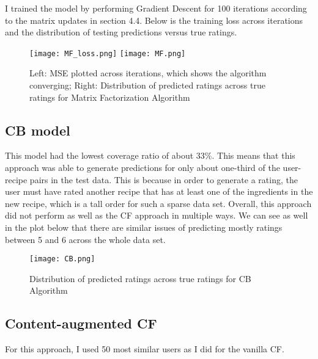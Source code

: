 \documentclass{article}
\begin{document}
I trained the model by performing Gradient Descent for 100 iterations according to the matrix updates in section 4.4. Below is the training loss across iterations and the distribution of testing predictions versus true ratings. 

\begin{figure}[H]
    \centering
    \texttt{[image: MF\_loss.png]}
    \texttt{[image: MF.png]}
    \caption{Left: MSE plotted across iterations, which shows the algorithm converging; Right: Distribution of predicted ratings across true ratings for Matrix Factorization Algorithm}
    \label{fig:CF}
\end{figure}

\subsection{CB model}

This model had the lowest coverage ratio of about 33\%. This means that this approach was able to generate predictions for only about one-third of the user-recipe pairs in the test data. This is because in order to generate a rating, the user must have rated another recipe that has at least one of the ingredients in the new recipe, which is a tall order for such a sparse data set. Overall, this approach did not perform as well as the CF approach in multiple ways. We can see as well in the plot below that there are similar issues of predicting mostly ratings between 5 and 6 across the whole data set. 


\begin{figure}[H]
    \centering
    \texttt{[image: CB.png]}
    \caption{Distribution of predicted ratings across true ratings for CB Algorithm}
    \label{fig:CB}
\end{figure}

\subsection{Content-augmented CF}

For this approach, I used 50 most similar users as I did for the vanilla CF. 
\end{document}
